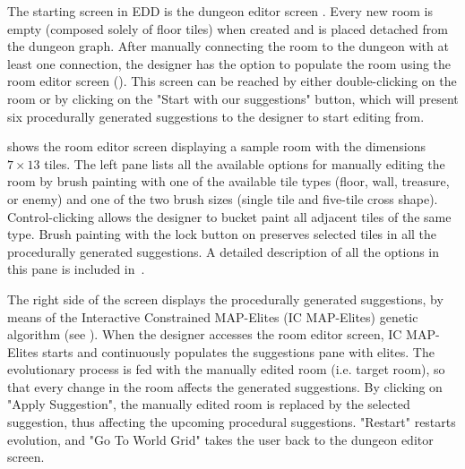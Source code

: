 The starting screen in EDD is the dungeon editor screen%
. Every new room is empty (composed solely of floor tiles) when created and is placed detached from the dungeon graph. After manually connecting the room to the dungeon with at least one connection, the designer has the option to populate the room using the room editor screen (). This screen can be reached by either double-clicking on the room or by clicking on the "Start with our suggestions" button, which will present six procedurally generated suggestions to the designer to start editing from. 



 shows the room editor screen displaying a sample room with the dimensions $7\times13$ tiles. The left pane lists all the available options for manually editing the room by brush painting with one of the available tile types (floor, wall, treasure, or enemy) and one of the two brush sizes (single tile and five-tile cross shape). Control-clicking allows the designer to bucket paint all adjacent tiles of the same type. Brush painting with the lock button on preserves selected tiles in all the procedurally generated suggestions. A detailed description of all the options in this pane is included in~\cite{p6Alvarez2018, Alvarez2018a}.

The right side of the screen displays the procedurally generated suggestions, by means of the Interactive Constrained MAP-Elites (IC MAP-Elites) genetic algorithm (see ). %
When the designer accesses the room editor screen, IC MAP-Elites starts and continuously populates the suggestions pane with elites. The evolutionary process is fed with the manually edited room (i.e. target room), so that every change in the room affects the generated suggestions. By clicking on "Apply Suggestion", the manually edited room is replaced by the selected suggestion, thus affecting the upcoming procedural suggestions. "Restart" restarts evolution, and "Go To World Grid" takes the user back to the dungeon editor screen.